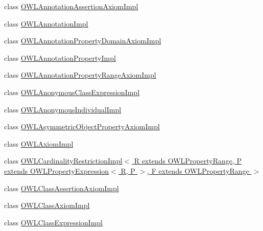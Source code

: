 \begin{DoxyCompactItemize}
\item 
class \hyperlink{classuk_1_1ac_1_1manchester_1_1cs_1_1owl_1_1owlapi_1_1_o_w_l_annotation_assertion_axiom_impl}{O\-W\-L\-Annotation\-Assertion\-Axiom\-Impl}
\item 
class \hyperlink{classuk_1_1ac_1_1manchester_1_1cs_1_1owl_1_1owlapi_1_1_o_w_l_annotation_impl}{O\-W\-L\-Annotation\-Impl}
\item 
class \hyperlink{classuk_1_1ac_1_1manchester_1_1cs_1_1owl_1_1owlapi_1_1_o_w_l_annotation_property_domain_axiom_impl}{O\-W\-L\-Annotation\-Property\-Domain\-Axiom\-Impl}
\item 
class \hyperlink{classuk_1_1ac_1_1manchester_1_1cs_1_1owl_1_1owlapi_1_1_o_w_l_annotation_property_impl}{O\-W\-L\-Annotation\-Property\-Impl}
\item 
class \hyperlink{classuk_1_1ac_1_1manchester_1_1cs_1_1owl_1_1owlapi_1_1_o_w_l_annotation_property_range_axiom_impl}{O\-W\-L\-Annotation\-Property\-Range\-Axiom\-Impl}
\item 
class \hyperlink{classuk_1_1ac_1_1manchester_1_1cs_1_1owl_1_1owlapi_1_1_o_w_l_anonymous_class_expression_impl}{O\-W\-L\-Anonymous\-Class\-Expression\-Impl}
\item 
class \hyperlink{classuk_1_1ac_1_1manchester_1_1cs_1_1owl_1_1owlapi_1_1_o_w_l_anonymous_individual_impl}{O\-W\-L\-Anonymous\-Individual\-Impl}
\item 
class \hyperlink{classuk_1_1ac_1_1manchester_1_1cs_1_1owl_1_1owlapi_1_1_o_w_l_asymmetric_object_property_axiom_impl}{O\-W\-L\-Asymmetric\-Object\-Property\-Axiom\-Impl}
\item 
class \hyperlink{classuk_1_1ac_1_1manchester_1_1cs_1_1owl_1_1owlapi_1_1_o_w_l_axiom_impl}{O\-W\-L\-Axiom\-Impl}
\item 
class \hyperlink{classuk_1_1ac_1_1manchester_1_1cs_1_1owl_1_1owlapi_1_1_o_w_l_cardinality_restriction_impl_3_01_r3eca1cd75ac91fcd50a6c201d3538b9b}{O\-W\-L\-Cardinality\-Restriction\-Impl$<$ R extends O\-W\-L\-Property\-Range, P extends O\-W\-L\-Property\-Expression$<$ R, P $>$, F extends O\-W\-L\-Property\-Range $>$}
\item 
class \hyperlink{classuk_1_1ac_1_1manchester_1_1cs_1_1owl_1_1owlapi_1_1_o_w_l_class_assertion_axiom_impl}{O\-W\-L\-Class\-Assertion\-Axiom\-Impl}
\item 
class \hyperlink{classuk_1_1ac_1_1manchester_1_1cs_1_1owl_1_1owlapi_1_1_o_w_l_class_axiom_impl}{O\-W\-L\-Class\-Axiom\-Impl}
\item 
class \hyperlink{classuk_1_1ac_1_1manchester_1_1cs_1_1owl_1_1owlapi_1_1_o_w_l_class_expression_impl}{O\-W\-L\-Class\-Expression\-Impl}

\end{DoxyCompactItemize}
